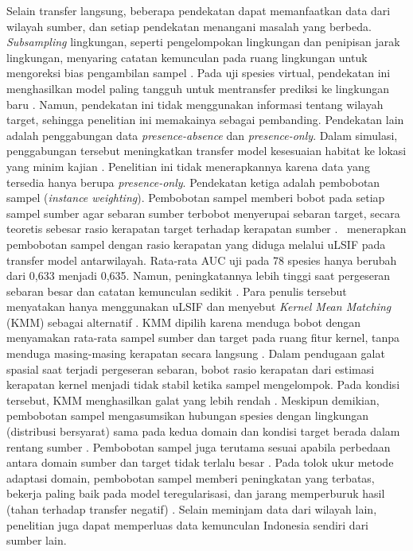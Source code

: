 Selain transfer langsung, beberapa pendekatan dapat memanfaatkan data dari
wilayah sumber, dan setiap pendekatan menangani masalah yang berbeda.
\textit{Subsampling} lingkungan, seperti pengelompokan lingkungan dan
penipisan jarak lingkungan, menyaring catatan kemunculan pada ruang lingkungan
untuk mengoreksi bias pengambilan sampel \citep{Pili2025}. Pada uji spesies
virtual, pendekatan ini menghasilkan model paling tangguh untuk mentransfer
prediksi ke lingkungan baru \citep{Pili2025}. Namun, pendekatan ini tidak
menggunakan informasi tentang wilayah target, sehingga penelitian ini
memakainya sebagai pembanding. Pendekatan lain adalah penggabungan data
\textit{presence-absence} dan \textit{presence-only}. Dalam simulasi,
penggabungan tersebut meningkatkan transfer model kesesuaian habitat ke lokasi
yang minim kajian \citep{Patterson2025}. Penelitian ini tidak menerapkannya
karena data yang tersedia hanya berupa \textit{presence-only}. Pendekatan
ketiga adalah pembobotan sampel (\textit{instance weighting}). Pembobotan
sampel memberi bobot pada setiap sampel sumber agar sebaran sumber terbobot
menyerupai sebaran target, secara teoretis sebesar rasio kerapatan target
terhadap kerapatan sumber \citep{Zhuang2021,Kouw2021}.\ \citet{Saigusa2026}
menerapkan pembobotan sampel dengan rasio kerapatan yang diduga melalui uLSIF
pada transfer model antarwilayah. Rata-rata AUC uji pada 78 spesies hanya
berubah dari 0,633 menjadi 0,635. Namun, peningkatannya lebih tinggi saat
pergeseran sebaran besar dan catatan kemunculan sedikit \citep{Saigusa2026}.
Para penulis tersebut menyatakan hanya menggunakan uLSIF dan menyebut
\textit{Kernel Mean Matching} (KMM) sebagai alternatif \citep{Saigusa2026}.
KMM dipilih karena menduga bobot dengan menyamakan rata-rata sampel sumber dan
target pada ruang fitur kernel, tanpa menduga masing-masing kerapatan secara
langsung \citep{Zhuang2021}. Dalam pendugaan galat spasial saat terjadi
pergeseran sebaran, bobot rasio kerapatan dari estimasi kerapatan kernel
menjadi tidak stabil ketika sampel mengelompok. Pada kondisi tersebut, KMM
menghasilkan galat yang lebih rendah \citep{Serov2026}. Meskipun demikian,
pembobotan sampel mengasumsikan hubungan spesies dengan lingkungan (distribusi
bersyarat) sama pada kedua domain dan kondisi target berada dalam rentang
sumber \citep{Kouw2021}. Pembobotan sampel juga terutama sesuai apabila
perbedaan antara domain sumber dan target tidak terlalu besar
\citep{Zhang2024}. Pada tolok ukur metode adaptasi domain, pembobotan sampel
memberi peningkatan yang terbatas, bekerja paling baik pada model
teregularisasi, dan jarang memperburuk hasil (tahan terhadap transfer negatif)
\citep{Lalou2025}. Selain meminjam data dari wilayah lain, penelitian juga
dapat memperluas data kemunculan Indonesia sendiri dari sumber lain.


